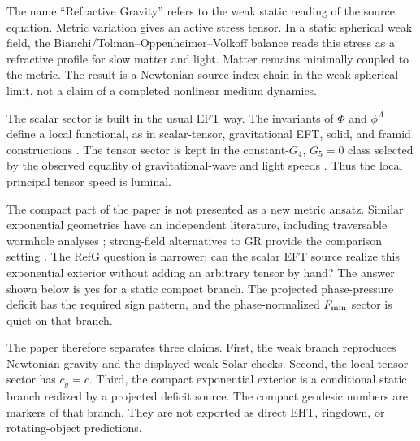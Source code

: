 \documentclass[12pt,a4paper]{article}
\begin{document}
The name ``Refractive Gravity'' refers to the weak static reading of the source
equation. Metric variation gives an active stress tensor. In a static spherical
weak field, the Bianchi/Tolman--Oppenheimer--Volkoff balance reads this stress
as a refractive profile for slow matter and light. Matter remains minimally
coupled to the metric. The result is a Newtonian source-index chain in the weak
spherical limit, not a claim of a completed nonlinear medium dynamics.

The scalar sector is built in the usual EFT way. The invariants of $\Phi$ and
$\phi^A$ define a local functional, as in scalar-tensor, gravitational EFT,
solid, and framid constructions
\cite{Horndeski1974,Gubitosi2013,BelliniSawicki2014,Deffayet2009,Kobayashi2011,Cheung2008,Endlich2013,Nicolis2015,Endlich2014,Bordin2017}.
The tensor sector is kept in the constant-$G_4$, $G_5=0$ class selected by the
observed equality of gravitational-wave and light speeds
\cite{Abbott2017GW,Abbott2017GRB,Creminelli2017,Sakstein2017}. Thus the local
principal tensor speed is luminal.

The compact part of the paper is not presented as a new metric ansatz. Similar
exponential geometries have an independent literature, including traversable
wormhole analyses \cite{Boonserm2018}; strong-field alternatives to GR provide
the comparison setting \cite{Damour1992,Damour1993,Damour1996}. The RefG
question is narrower: can the scalar EFT source realize this exponential
exterior without adding an arbitrary tensor by hand? The answer shown below is
yes for a static compact branch. The projected phase-pressure deficit has the
required sign pattern, and the phase-normalized $F_{\rm min}$ sector is quiet on
that branch.

The paper therefore separates three claims. First, the weak branch reproduces
Newtonian gravity and the displayed weak-Solar checks. Second, the local tensor
sector has $c_g=c$. Third, the compact exponential exterior is a conditional
static branch realized by a projected deficit source. The compact geodesic
numbers are markers of that branch. They are not exported as direct EHT,
ringdown, or rotating-object predictions.

\medskip
\end{document}
